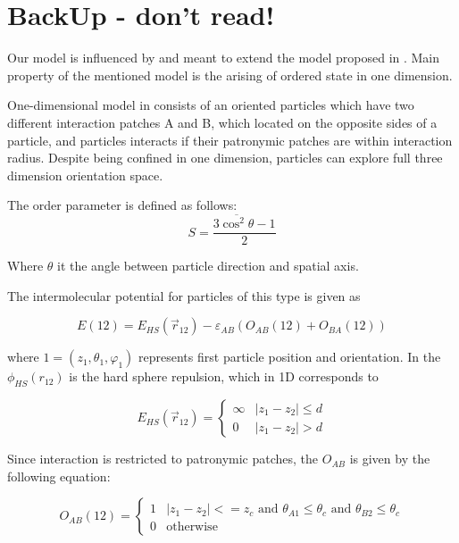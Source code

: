 \section{BackUp - don't read!}
Our model is influenced by and meant to extend the model proposed in \cite{Marshall2015}. Main property of the mentioned model is the arising of ordered state in one dimension.

One-dimensional model in \cite{Marshall2015} consists of an oriented particles which have two different interaction patches A and B, which located on the opposite sides of a particle, and particles interacts if their patronymic patches are within interaction radius. Despite being confined in one dimension, particles can explore full three dimension orientation space.

The order parameter is defined as follows:
\begin{equation}
S = \frac{3 \overline{\cos^2 \theta} - 1}{2}
\end{equation}

Where $\theta$ it the angle between particle direction and spatial axis.

The intermolecular potential for particles of this type is given as

\begin{equation}
E(12) = E_{HS}(\vec{r}_{12}) - \varepsilon_{AB}(O_{AB}(12) + O_{BA}(12))
\end{equation}

where $1 = (z_1, \theta_1, \varphi_1)$ represents first particle position and orientation. In \cite{Marshall2015} the $\phi_{HS}(r_{12})$ is the hard sphere repulsion, which in 1D corresponds to

\begin{equation}
E_{HS}(\vec{r}_{12}) = \begin{cases}
	\infty &\text{$|z_1 - z_2| \leq d$}\\
   	0 	&\text{$|z_1 - z_2| > d$}
\end{cases}
\end{equation}

Since interaction is restricted to patronymic patches, the $O_{AB}$ is given by the following equation:

\begin{equation}
O_{AB}(12) = \begin{cases}
	1 &\text{$|z_1 - z_2| <= z_c$ and $\theta_{A1} \leq \theta_c$ and $\theta_{B2} \leq \theta_c $}\\
   	0 &\text{otherwise}
\end{cases}
\end{equation}

